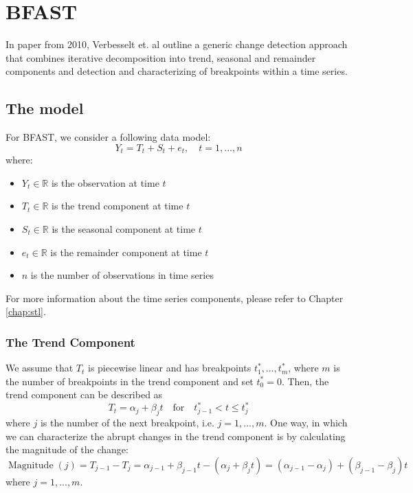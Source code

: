 \documentclass[main.tex]{subfiles}
\begin{document}
\chapter{BFAST}
\label{chap:bfast}
In paper from 2010, Verbesselt et. al \cite{bfast} outline a generic change detection approach
that combines iterative decomposition into trend, seasonal and remainder components and detection
and characterizing of breakpoints within a time series. 

\section{The model}
\label{sec:bfast_the_model}
For BFAST, we consider a following data model:
\[
Y_t = T_t + S_t + e_t, \quad t = 1,...,n
\]
where:
\begin{itemize}
\item $Y_t \in \mathbb{R}$ is the observation at time $t$
\item $T_t \in \mathbb{R}$ is the trend component at time $t$
\item $S_t \in \mathbb{R}$ is the seasonal component at time $t$
\item $e_t \in \mathbb{R}$ is the remainder component at time $t$
\item $n$ is the number of observations in time series
\end{itemize}
For more information about the time series components, please refer to Chapter
\ref{chap:stl}.
\subsection{The Trend Component}
\label{subsec:trend}
We assume that $T_t$ is piecewise linear and has breakpoints $t_1^*,\hdots, t_m^*$,
where $m$ is the number of breakpoints in the trend component and set $t_0^* = 0$.
Then, the trend component can be described as
\[
T_t = \alpha_j + \beta_j t \quad \text{for}\quad t^*_{j-1}<t\leq t_j^*
\]
where $j$ is the number of the next breakpoint, i.e. $j = 1,...,m$. One way, in
which we can characterize the abrupt changes in the trend component is by
calculating the magnitude of the change:
\[
\operatorname{Magnitude}(j) = T_{j-1} - T_{j} = \alpha_{j-1} + \beta_{j-1} t -
(\alpha_j + \beta_j t) = (\alpha_{j-1} - \alpha_j) + (\beta_{j-1} - \beta_j)t
\]
where $j = 1,...,m$.
\end{document}
